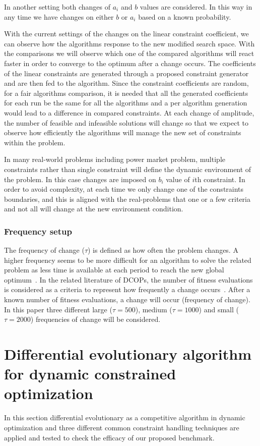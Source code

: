 \documentclass[review]{elsarticle}
\begin{document}
In another setting both changes of $a_i$ and $b$ values are considered. In this way in any time we have changes on either $b$ or $a_i$ based on a known probability.

With the current settings of the changes on the linear constraint coefficient, we can observe how the algorithms response to the new modified search space. With the comparisons we will observe which one of the compared algorithms will react faster in order to converge to the optimum after a change occurs. 
The coefficients of the linear constraints are generated through a proposed constraint generator and are then fed to the algorithm. Since the constraint coefficients are random, for a fair algorithms comparison, it is needed that all the generated coefficients for each run be the same for all the algorithms and a per algorithm generation would lead to a difference in compared constraints.
At each change of amplitude, the number of feasible and infeasible solutions will change so that we expect to observe how efficiently the algorithms will manage the new set of constraints within the problem.

In many real-world problems including power market problem, multiple constraints rather than single constraint will define the dynamic environment of the problem. In this case changes are imposed on $b_i$ value of $i$th constraint. In order to avoid complexity, at each time we only change one of the constraints boundaries, and this is aligned with the real-problems that one or a few criteria and not all will change at the new environment condition.   
\subsubsection{Frequency setup}
\label{subsec:FrequencySetup}

The frequency of change ($\tau$) is defined as how often the problem changes. A higher frequency seems to be more difficult for an algorithm to solve the related problem as less time is available at each period to reach the new global optimum~\citep{rohlfshagen2009dynamic}.
In the related literature of DCOPs, the number of fitness evaluations is considered as a criteria to represent how frequently a change occurs~\citep{DCOPS}. After a known number of fitness evaluations, a change will occur (frequency of change). In this paper three different large ($\tau=500$), medium ($\tau=1000$) and small ($\tau=2000$) frequencies of change will be considered.

\section{Differential evolutionary algorithm for dynamic constrained optimization}
In this section differential evolutionary as a competitive algorithm in dynamic optimization and three different common constraint handling techniques are applied and tested to check the efficacy of our proposed benchmark.
\end{document}
